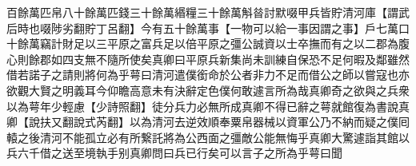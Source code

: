 百餘萬匹帛八十餘萬匹錢三十餘萬緡糧三十餘萬斛㫺討默啜甲兵皆貯清河庫【謂武后時也啜陟劣翻貯丁呂翻】今有五十餘萬事【一物可以給一事因謂之事】戶七萬口十餘萬竊計財足以三平原之富兵足以倍平原之彊公誠資以士卒撫而有之以二郡為腹心則餘郡如四支無不隨所使矣真卿曰平原兵新集尚未訓練自保恐不足何暇及鄰雖然借若諾子之請則將何為乎萼曰清河遣僕銜命於公者非力不足而借公之師以嘗寇也亦欲觀大賢之明義耳今仰瞻高意未有決辭定色僕何敢遽言所為哉真卿奇之欲與之兵衆以為萼年少輕慮【少詩照翻】徒分兵力必無所成真卿不得已辭之萼就館復為書說真卿【說扶又翻說式芮翻】以為清河去逆效順奉粟帛器械以資軍公乃不納而疑之僕囘轅之後清河不能孤立必有所繋託將為公西面之彊敵公能無悔乎真卿大驚遽詣其館以兵六千借之送至境執手别真卿問曰兵已行矣可以言子之所為乎萼曰聞
